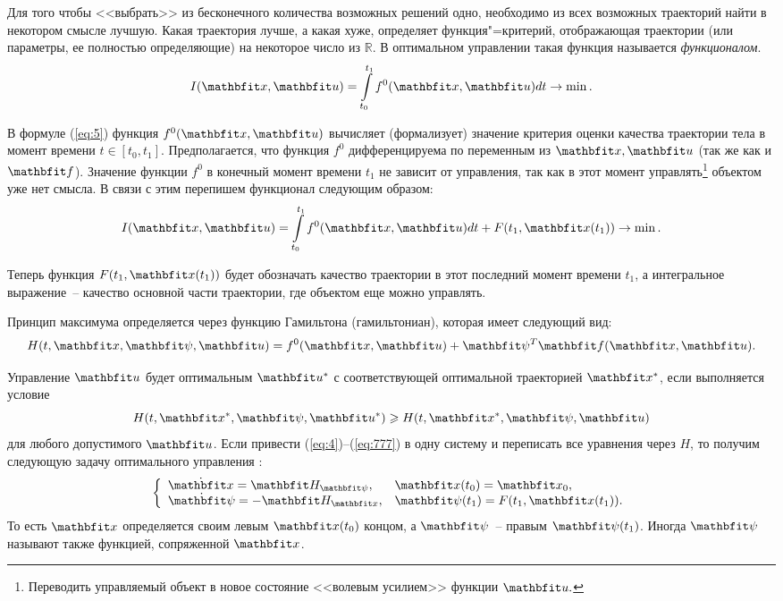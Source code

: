 \documentclass[a4paper,14pt, openany, twoside, final]{extbook} %
\begin{document}
Для того чтобы <<выбрать>> из бесконечного количества возможных решений одно, необходимо из всех возможных траекторий найти в некотором смысле лучшую.  Какая траектория лучше, а какая хуже, определяет функция"=критерий, отображающая траектории (или параметры, ее полностью определяющие) на некоторое число из $\mathbb{R}$.  В оптимальном управлении такая функция называется \emph{функционалом}.
\begin{equation}
  \label{eq:5}
  I(\vecx,\vecu)=\int\limits_{t_0}^{t_1}f^0(\vecx,\vecu)dt \to \min.
\end{equation}

В формуле (\ref{eq:5}) функция $f^0(\vecx,\vecu)$ вычисляет (формализует) значение критерия оценки качества траектории тела в момент времени $t\in[t_0,t_1]$.  Предполагается, что функция $f^0$ дифференцируема по переменным из $\vecx,\vecu$ (так же как и $\vecf$).  Значение функции $f^0$ в конечный момент времени $t_1$ не зависит от управления, так как в этот момент управлять\footnote{Переводить управляемый объект в новое состояние <<волевым усилием>> функции $\vecu.$} объектом уже нет смысла.  В связи с этим перепишем функционал следующим образом:
\begin{equation}
  \label{eq:6}
  I(\vecx,\vecu)=\int\limits_{t_0}^{t_1}f^0(\vecx,\vecu)dt+F(t_1,\vecx(t_1)) \to \min.
\end{equation}

\noindent{}Теперь функция $F(t_1,\vecx(t_1))$ будет обозначать качество траектории в этот последний момент времени $t_1$, а интегральное выражение~-- качество основной части траектории, где объектом еще можно управлять.

Принцип максимума определяется через функцию Гамильтона (гамильтониан), которая имеет следующий вид:
\begin{equation}
  \label{eq:7}
  H(t,\vecx,\vecpsi,\vecu)=f^0(\vecx,\vecu)+\vecpsi^T\vecf(\vecx,\vecu).
\end{equation}

Управление $\vecu$ будет оптимальным $\vecu^*$ с соответствующей оптимальной траекторией $\vecx^*$, если выполняется условие
\begin{equation}
  \label{eq:777}
  H(t,\vecx^*,\vecpsi,\vecu^*)\geqslant H(t,\vecx^*,\vecpsi,\vecu)
\end{equation}
для любого допустимого $\vecu$.  Если привести (\ref{eq:4})--(\ref{eq:777}) в одну систему и переписать все уравнения через $H$, то получим следующую задачу оптимального управления \cite{sethi}:
\begin{equation}
  \label{eq:8}
  \left\{
    \begin{array}{ll}
      \dot{\vecx}=\vecH_{\vecpsi}, & \vecx(t_0)=\vecx_0,\\
      \dot{\vecpsi}=-\vecH_{\vecx}, & \vecpsi(t_1)=F(t_1,\vecx(t_1)).
    \end{array}
  \right.
\end{equation}
То есть $\vecx$ определяется своим левым $\vecx(t_0)$ концом, а $\vecpsi$~-- правым $\vecpsi(t_1)$.  Иногда $\vecpsi$ называют также функцией, сопряженной $\vecx$.
\end{document}
